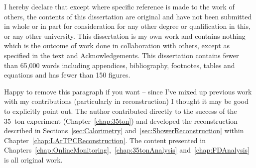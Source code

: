 
\begin{declaration}

I hereby declare that except where specific reference is made to the work of 
others, the contents of this dissertation are original and have not been 
submitted in whole or in part for consideration for any other degree or 
qualification in this, or any other university. This dissertation is my own 
work and contains nothing which is the outcome of work done in collaboration 
with others, except as specified in the text and Acknowledgements. This 
dissertation contains fewer than 65,000 words including appendices, 
bibliography, footnotes, tables and equations and has fewer than 150 figures.


{\color{red}Happy to remove this paragraph if you want -- since I've mixed up previous work with my contributions (particularly in reconstruction) I thought it may be good to explicitly point out.} The author contributed directly to the success of the 35~ton experiment (Chapter~\ref{chap:35ton}) and developed the reconstruction described in Sections~\ref{sec:Calorimetry} and~\ref{sec:ShowerReconstruction} within Chapter~\ref{chap:LArTPCReconstruction}.  The content presented in Chapters~\ref{chap:OnlineMonitoring},~\ref{chap:35tonAnalysis} and~\ref{chap:FDAnalysis} is all original work.


\end{declaration}


